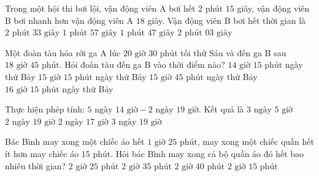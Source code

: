 \begin{ex} %
Trong một hội thi bơi lội, vận động viên A bơi hết $2$ phút $15$ giây, vận động viên B bơi nhanh hơn vận động viên A $18$ giây. Vận động viên B bơi hết thời gian là
\choice
{$2\text{ phút } 33\text{ giây}$}
{\True $1\text{ phút } 57\text{ giây}$}
{$1\text{ phút } 47\text{ giây}$}
{$2\text{ phút } 03\text{ giây}$}
\end{ex}

\begin{ex} %
Một đoàn tàu hỏa rời ga A lúc $20\text{ giờ } 30\text{ phút}$ tối thứ Sáu và đến ga B sau $18\text{ giờ } 45\text{ phút}$. Hỏi đoàn tàu đến ga B vào thời điểm nào?
\choice
{$14\text{ giờ } 15\text{ phút}$ ngày thứ Bảy}
{\True $15\text{ giờ } 15\text{ phút}$ ngày thứ Bảy}
{$15\text{ giờ } 45\text{ phút}$ ngày thứ Bảy}
{$16\text{ giờ } 15\text{ phút}$ ngày thứ Bảy}
\end{ex}

\begin{ex} %
Thực hiện phép tính: $5\text{ ngày } 14\text{ giờ} - 2\text{ ngày } 19\text{ giờ}$. Kết quả là
\choice
{$3\text{ ngày } 5\text{ giờ}$}
{\True $2\text{ ngày } 19\text{ giờ}$}
{$2\text{ ngày } 17\text{ giờ}$}
{$3\text{ ngày } 19\text{ giờ}$}
\end{ex}

\begin{ex} %
Bác Bình may xong một chiếc áo hết $1\text{ giờ } 25\text{ phút}$, may xong một chiếc quần hết ít hơn may chiếc áo $15\text{ phút}$. Hỏi bác Bình may xong cả bộ quần áo đó hết bao nhiêu thời gian?
\choice
{$2\text{ giờ } 25\text{ phút}$}
{\True $2\text{ giờ } 35\text{ phút}$}
{$2\text{ giờ } 40\text{ phút}$}
{$2\text{ giờ } 15\text{ phút}$}
\end{ex}

